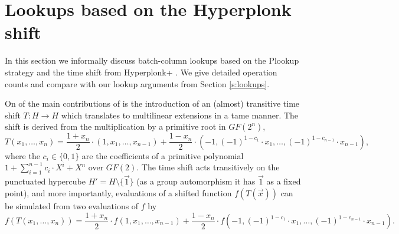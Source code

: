 \documentclass[11pt]{article}
\theoremstyle{definition}
\theoremstyle{remark}
\begin{document}

\section{Lookups based on the Hyperplonk shift}
\label{s:hyperplonk}

In this section we informally discuss batch-column lookups based on the Plookup strategy and the time shift from Hyperplonk+ \cite{Hyperplonk}. 
We  give detailed operation counts and compare with our lookup arguments from Section \ref{s:lookups}.

On of the main contributions of \cite{Hyperplonk} is the introduction of an (almost) transitive time shift $T: H\rightarrow H$ which translates to multilinear extensions in a tame manner.  
The shift is derived from the multiplication by a primitive root in $GF(2^n)$, 
\[
T(x_1, \ldots, x_n) = \frac{1 + x_n}{2} \cdot (1, x_1,\ldots, x_{n-1}) + \frac{1 - x_n }{2} \cdot (- 1,(-1)^{1 - c_1}\cdot x_1,\ldots, (-1)^{1 - c_{n - 1}}\cdot x_{n-1}),
\]  
where the $c_i\in\{0,1\}$ are the coefficients of a primitive polynomial $1 + \sum_{i=1}^{n-1} c_i\cdot X^i + X^n$ over $GF(2)$.
The time shift acts transitively on the punctuated hypercube $H' = H\setminus\{\vec 1\}$ (as a group automorphism it has $\vec 1$ as a fixed point), and more importantly, evaluations of a shifted function $f(T(\vec x))$ can be simulated from two evaluations of $f$ by
\begin{equation}
\label{e:hyperplonk:shifted:function}
f(T(x_1, \ldots, x_n)) =  \frac{1 + x_n}{2} \cdot f(1, x_1,\ldots, x_{n-1}) + \frac{1 - x_n }{2} \cdot f(- 1,(-1)^{1 - c_1}\cdot x_1,\ldots, (-1)^{1 - c_{n - 1}}\cdot x_{n-1}).
\end{equation}
\end{document}
